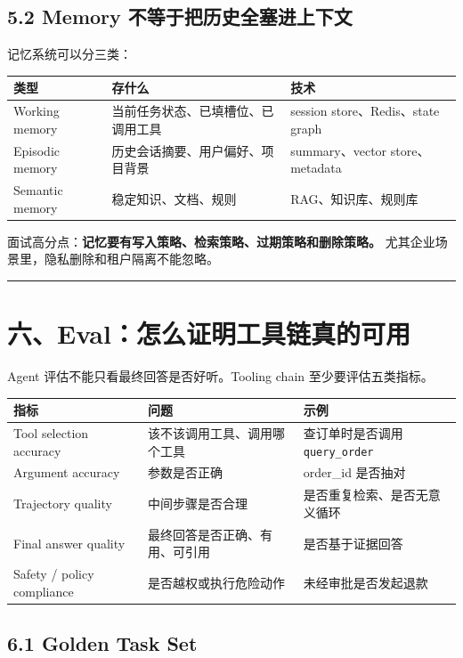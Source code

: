 \subsection{5.2 Memory 不等于把历史全塞进上下文}

记忆系统可以分三类：


\begingroup
\scriptsize
\setlength{\tabcolsep}{3pt}
\begin{longtable}{|p{}|p{}|p{}|}
\hline
类型 & 存什么 & 技术 \\ \hline
Working memory & 当前任务状态、已填槽位、已调用工具 & session store、Redis、state graph \\ \hline
Episodic memory & 历史会话摘要、用户偏好、项目背景 & summary、vector store、metadata \\ \hline
Semantic memory & 稳定知识、文档、规则 & RAG、知识库、规则库 \\ \hline
\end{longtable}
\endgroup

面试高分点：\textbf{记忆要有写入策略、检索策略、过期策略和删除策略。} 尤其企业场景里，隐私删除和租户隔离不能忽略。


\bigskip\hrule\bigskip

\section{六、Eval：怎么证明工具链真的可用}

Agent 评估不能只看最终回答是否好听。Tooling chain 至少要评估五类指标。


\begingroup
\scriptsize
\setlength{\tabcolsep}{3pt}
\begin{longtable}{|p{}|p{}|p{}|}
\hline
指标 & 问题 & 示例 \\ \hline
Tool selection accuracy & 该不该调用工具、调用哪个工具 & 查订单时是否调用 \texttt{query\_order} \\ \hline
Argument accuracy & 参数是否正确 & order\_id 是否抽对 \\ \hline
Trajectory quality & 中间步骤是否合理 & 是否重复检索、是否无意义循环 \\ \hline
Final answer quality & 最终回答是否正确、有用、可引用 & 是否基于证据回答 \\ \hline
Safety / policy compliance & 是否越权或执行危险动作 & 未经审批是否发起退款 \\ \hline
\end{longtable}
\endgroup

\subsection{6.1 Golden Task Set}

